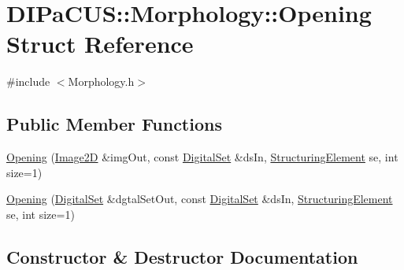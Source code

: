\hypertarget{structDIPaCUS_1_1Morphology_1_1Opening}{}\section{D\+I\+Pa\+C\+US\+:\+:Morphology\+:\+:Opening Struct Reference}
\label{structDIPaCUS_1_1Morphology_1_1Opening}


{\ttfamily \#include $<$Morphology.\+h$>$}

\subsection*{Public Member Functions}
\begin{DoxyCompactItemize}
\item 
\mbox{\hyperlink{structDIPaCUS_1_1Morphology_1_1Opening_a064a3cecb16cac3abf6181fa10b7a324}{Opening}} (\mbox{\hyperlink{namespaceDIPaCUS_1_1Morphology_a9aff9edf28d681accfc54435fbefcbee}{Image2D}} \&img\+Out, const \mbox{\hyperlink{namespaceDIPaCUS_1_1Morphology_ab69fa725716b0ed4c311c0d00a292be7}{Digital\+Set}} \&ds\+In, \mbox{\hyperlink{namespaceDIPaCUS_1_1Morphology_a60b552d68432e7992f09717070d9c4e7}{Structuring\+Element}} se, int size=1)
\item 
\mbox{\hyperlink{structDIPaCUS_1_1Morphology_1_1Opening_abef71bdce6c02360740c782b11bfdfa1}{Opening}} (\mbox{\hyperlink{namespaceDIPaCUS_1_1Morphology_ab69fa725716b0ed4c311c0d00a292be7}{Digital\+Set}} \&dgtal\+Set\+Out, const \mbox{\hyperlink{namespaceDIPaCUS_1_1Morphology_ab69fa725716b0ed4c311c0d00a292be7}{Digital\+Set}} \&ds\+In, \mbox{\hyperlink{namespaceDIPaCUS_1_1Morphology_a60b552d68432e7992f09717070d9c4e7}{Structuring\+Element}} se, int size=1)
\end{DoxyCompactItemize}


\subsection{Constructor \& Destructor Documentation}
\mbox{\label{structDIPaCUS_1_1Morphology_1_1Opening_a064a3cecb16cac3abf6181fa10b7a324}} 
